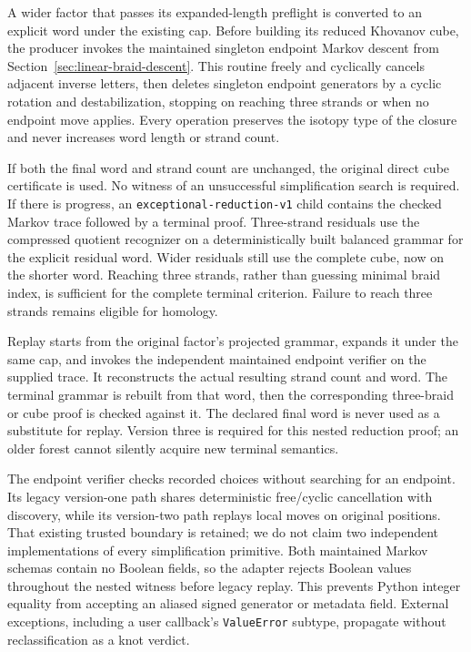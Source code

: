 A wider factor that passes its expanded-length preflight is converted to an
explicit word under the existing cap. Before building its reduced Khovanov
cube, the producer invokes the maintained singleton endpoint Markov descent
from Section~\ref{sec:linear-braid-descent}. This routine freely and cyclically
cancels adjacent inverse letters, then deletes singleton endpoint generators
by a cyclic rotation and destabilization, stopping on reaching three strands
or when no endpoint move applies. Every operation preserves the isotopy type
of the closure and never increases word length or strand count.

If both the final word and strand count are unchanged, the original direct
cube certificate is used. No witness of an unsuccessful simplification search
is required. If there is progress, an \texttt{exceptional-reduction-v1} child
contains the checked Markov trace followed by a terminal proof. Three-strand
residuals use the compressed quotient recognizer on a deterministically built
balanced grammar for the explicit residual word. Wider residuals still use
the complete cube, now on the shorter word. Reaching three strands, rather
than guessing minimal braid index, is sufficient for the complete terminal
criterion. Failure to reach three strands remains eligible for homology.

Replay starts from the original factor's projected grammar, expands it under
the same cap, and invokes the independent maintained endpoint verifier on the
supplied trace. It reconstructs the actual resulting strand count and word.
The terminal grammar is rebuilt from that word, then the corresponding
three-braid or cube proof is checked against it. The declared final word is
never used as a substitute for replay. Version three is required for this
nested reduction proof; an older forest cannot silently acquire new terminal
semantics.

The endpoint verifier checks recorded choices without searching for an
endpoint. Its legacy version-one path shares deterministic free/cyclic
cancellation with discovery, while its version-two path replays local moves
on original positions. That existing trusted boundary is retained; we do not
claim two independent implementations of every simplification primitive.
Both maintained Markov schemas contain no Boolean fields, so the adapter
rejects Boolean values throughout the nested witness before legacy replay.
This prevents Python integer equality from accepting an aliased signed
generator or metadata field. External exceptions, including a user callback's
\texttt{ValueError} subtype, propagate without reclassification as a knot
verdict.

